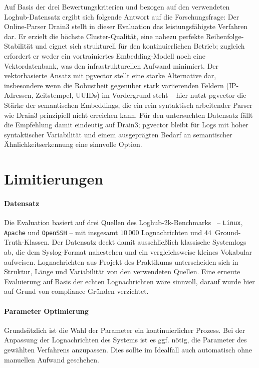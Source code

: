 Auf Basis der drei Bewertungskriterien und bezogen auf den verwendeten Loghub-Datensatz ergibt sich folgende Antwort auf die Forschungsfrage: Der Online-Parser Drain3 stellt in dieser Evaluation das leistungsfähigste Verfahren dar. Er erzielt die höchste Cluster-Qualität, eine nahezu perfekte Reihenfolge-Stabilität und eignet sich strukturell für den kontinuierlichen Betrieb; zugleich erfordert er weder ein vortrainiertes Embedding-Modell noch eine Vektordatenbank, was den infrastrukturellen Aufwand minimiert. Der vektorbasierte Ansatz mit pgvector stellt eine starke Alternative dar, insbesondere wenn die Robustheit gegenüber stark variierenden Feldern (IP-Adressen, Zeitstempel, UUIDs) im Vordergrund steht -- hier nutzt pgvector die Stärke der semantischen Embeddings, die ein rein syntaktisch arbeitender Parser wie Drain3 prinzipiell nicht erreichen kann. Für den untersuchten Datensatz fällt die Empfehlung damit eindeutig auf Drain3; pgvector bleibt für Logs mit hoher syntaktischer Variabilität und einem ausgeprägten Bedarf an semantischer Ähnlichkeitserkennung eine sinnvolle Option.

\section{Limitierungen}
\label{sec:abschluss:limitierungen}

\paragraph{Datensatz}
Die Evaluation basiert auf drei Quellen des Loghub-2k-Benchmarks~\cite{zhu2023loghublargecollectionlog} -- \texttt{Linux}, \texttt{Apache} und \texttt{OpenSSH} -- mit insgesamt $10\,000$ Lognachrichten und $44$~Ground-Truth-Klassen. Der Datensatz deckt damit ausschließlich klassische Systemlogs ab, die dem Syslog-Format nahestehen und ein vergleichsweise kleines Vokabular aufweisen. Lognachrichten aus Projekt des Praktikums unterscheiden sich in Struktur, Länge und Variabilität von den verwendeten Quellen. Eine erneute Evaluierung auf Basis der echten Lognachrichten wäre sinnvoll, darauf wurde hier auf Grund von compliance Gründen verzichtet. 

\paragraph{Parameter Optimierung}
Grundsätzlich ist die Wahl der Parameter ein kontinuierlicher Prozess. Bei der Anpassung der Lognachrichten des Systems ist es ggf. nötig, die Parameter des gewählten Verfahrens anzupassen. Dies sollte im Idealfall auch automatisch ohne manuellen Aufwand geschehen. 

